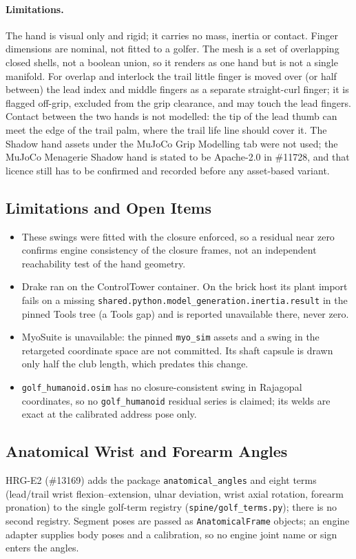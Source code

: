 \documentclass[11pt,a4paper]{article}
\begin{document}
\paragraph{Limitations.} The hand is visual only and rigid; it carries no
mass, inertia or contact. Finger dimensions are nominal, not fitted to a
golfer. The mesh is a set of overlapping closed shells, not a boolean union,
so it renders as one hand but is not a single manifold. For overlap and
interlock the trail little finger is moved over (or half between) the lead
index and middle fingers as a separate straight-curl finger; it is flagged
off-grip, excluded from the grip clearance, and may touch the lead fingers.
Contact between the two hands is not modelled: the tip of the lead thumb can
meet the edge of the trail palm, where the trail life line should cover it.
The Shadow hand assets under the MuJoCo Grip Modelling tab were not used; the
MuJoCo Menagerie Shadow hand is stated to be Apache-2.0 in \#11728, and that
licence still has to be confirmed and recorded before any asset-based variant.

\subsection{Limitations and Open Items}
\begin{itemize}
\item These swings were fitted with the closure enforced, so a residual near
 zero confirms engine consistency of the closure frames, not an independent
 reachability test of the hand geometry.
\item Drake ran on the ControlTower container. On the brick host its plant
 import fails on a missing
 \texttt{shared.python.model\_generation.inertia.result} in the pinned Tools
 tree (a Tools gap) and is reported unavailable there, never zero.
\item MyoSuite is unavailable: the pinned \texttt{myo\_sim} assets and a swing
 in the retargeted coordinate space are not committed. Its shaft capsule is
 drawn only half the club length, which predates this change.
\item \texttt{golf\_humanoid.osim} has no closure-consistent swing in
 Rajagopal coordinates, so no \texttt{golf\_humanoid} residual series is
 claimed; its welds are exact at the calibrated address pose only.
\end{itemize}

\subsection{Anatomical Wrist and Forearm Angles}
HRG-E2 (\#13169) adds the package \texttt{anatomical\_angles} and eight terms
(lead/trail wrist flexion--extension, ulnar deviation, wrist axial rotation,
forearm pronation) to the single golf-term registry
(\texttt{spine/golf\_terms.py}); there is no second registry. Segment poses are
passed as \texttt{AnatomicalFrame} objects; an engine adapter supplies body
poses and a calibration, so no engine joint name or sign enters the angles.
\end{document}
